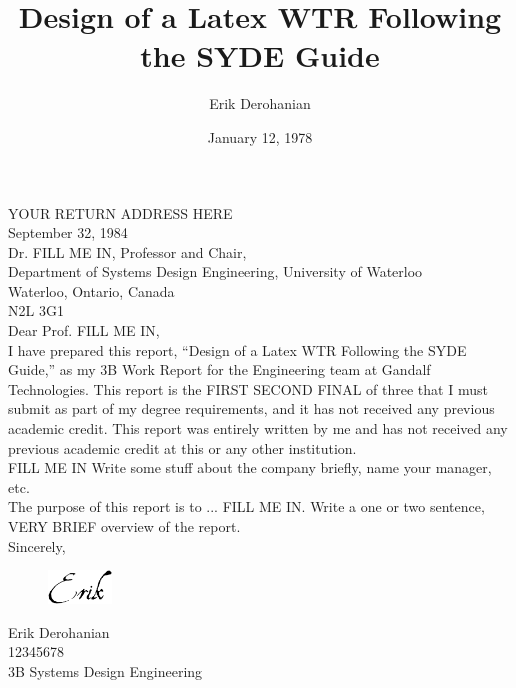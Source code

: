 \documentclass[12pt]{article}
\title{Design of a Latex WTR Following the SYDE Guide}
\author{Erik Derohanian}
\date{January 12, 1978}
\begin{document}
	\startindent
	\makewtrtitle

	\stopindent
        \begin{spacing}{1.0}

	YOUR RETURN ADDRESS HERE \\

    	September 32, 1984 \\

    	Dr. FILL ME IN, Professor and Chair, \\
    	Department of Systems Design Engineering, University of Waterloo \\
    	Waterloo, Ontario, Canada \\
    	N2L 3G1\\
    	
    	Dear Prof. FILL ME IN, \\
    
        I have prepared this report, “Design of a Latex WTR Following the SYDE Guide,” as my 3B Work Report for the Engineering team at Gandalf Technologies. This report is the FIRST SECOND FINAL of three that I must submit as part of my degree requirements, and it has not received any previous academic credit. This report was entirely written by me and has not received any previous academic credit at this or any other institution.\\
    	
    	FILL ME IN Write some stuff about the company briefly, name your manager, etc. \\
    	
    	The purpose of this report is to ... FILL ME IN. Write a one or two sentence, VERY BRIEF overview of the report. \\

    	Sincerely,
    
    	\begin{figure}[!ht]
        \includegraphics[width=0.15\textwidth]{signature}
        \end{figure}
    	
    	Erik Derohanian \\
    	12345678 \\
    	3B Systems Design Engineering

	\end{spacing}
	\newpage
	\startindent
\end{document}
